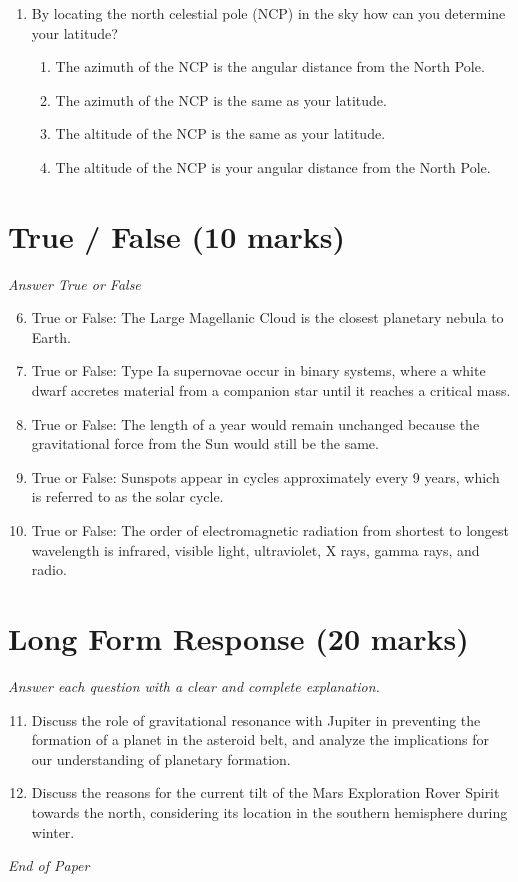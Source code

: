 \documentclass[12pt]{article}
\begin{document}
\begin{enumerate}[label=\arabic*.]
\begin{enumerate}[label=(\alph*)]
    \item The U.S.S.R.
    \item The U.S.
    \item France
    \item A and B
\end{enumerate}
\item By locating the north celestial pole (NCP) in the sky how can you determine your latitude?
\begin{enumerate}[label=(\alph*)]
    \item The azimuth of the NCP is the angular distance from the North Pole.
    \item The azimuth of the NCP is the same as your latitude.
    \item The altitude of the NCP is the same as your latitude.
    \item The altitude of the NCP is your angular distance from the North Pole.
\end{enumerate}
\end{enumerate}

\section*{True / False (10 marks)}
\textit{Answer True or False}
\begin{enumerate}[label=\arabic*.]
\setcounter{enumi}{5}
\item True or False: The Large Magellanic Cloud is the closest planetary nebula to Earth.
\item True or False: Type Ia supernovae occur in binary systems, where a white dwarf accretes material from a companion star until it reaches a critical mass.
\item True or False: The length of a year would remain unchanged because the gravitational force from the Sun would still be the same.
\item True or False: Sunspots appear in cycles approximately every 9 years, which is referred to as the solar cycle.
\item True or False: The order of electromagnetic radiation from shortest to longest wavelength is infrared, visible light, ultraviolet, X rays, gamma rays, and radio.
\end{enumerate}

\section*{Long Form Response (20 marks)}
\textit{Answer each question with a clear and complete explanation.}
\begin{enumerate}[label=\arabic*.]
\setcounter{enumi}{10}
\item Discuss the role of gravitational resonance with Jupiter in preventing the formation of a planet in the asteroid belt, and analyze the implications for our understanding of planetary formation.
\item Discuss the reasons for the current tilt of the Mars Exploration Rover Spirit towards the north, considering its location in the southern hemisphere during winter.
\end{enumerate}

\vfill
\noindent\textit{End of Paper}
\end{document}
